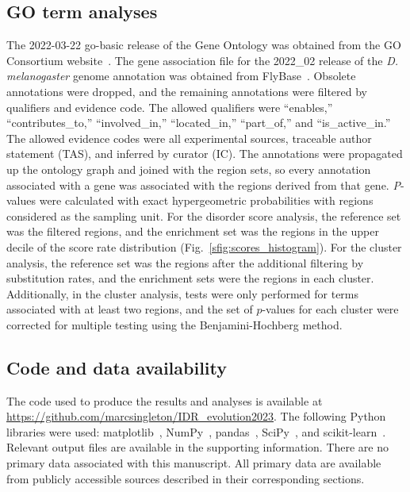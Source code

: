 \subsection{GO term analyses}
The 2022-03-22 go-basic release of the Gene Ontology was obtained from the GO Consortium website~\cite{Ashburner2000, 2020GOConsortium}. The gene association file for the 2022\_02 release of the \textit{D. melanogaster} genome annotation was obtained from FlyBase~\cite{Gramates2022}. Obsolete annotations were dropped, and the remaining annotations were filtered by qualifiers and evidence code. The allowed qualifiers were ``enables,'' ``contributes\_to,'' ``involved\_in,'' ``located\_in,'' ``part\_of,'' and ``is\_active\_in.'' The allowed evidence codes were all experimental sources, traceable author statement (TAS), and inferred by curator (IC). The annotations were propagated up the ontology graph and joined with the region sets, so every annotation associated with a gene was associated with the regions derived from that gene. \textit{P}-values were calculated with exact hypergeometric probabilities with regions considered as the sampling unit. For the disorder score analysis, the reference set was the filtered regions, and the enrichment set was the regions in the upper decile of the score rate distribution (Fig.~\ref{sfig:scores_histogram}). For the cluster analysis, the reference set was the regions after the additional filtering by substitution rates, and the enrichment sets were the regions in each cluster. Additionally, in the cluster analysis, tests were only performed for terms associated with at least two regions, and the set of $p$-values for each cluster were corrected for multiple testing using the Benjamini-Hochberg method.

\subsection{Code and data availability}
\begin{sloppypar}
The code used to produce the results and analyses is available at \url{https://github.com/marcsingleton/IDR_evolution2023}. The following Python libraries were used: matplotlib~\cite{Hunter2007}, NumPy~\cite{Harris2020}, pandas~\cite{McKinney2010}, SciPy~\cite{Virtanen2020}, and scikit-learn~\cite{Pedregosa2011}. Relevant output files are available in the supporting information. There are no primary data associated with this manuscript. All primary data are available from publicly accessible sources described in their corresponding sections.
\end{sloppypar}

